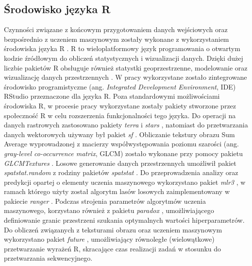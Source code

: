 \documentclass{amuthesis}
\begin{document}
\hypertarget{ux15brodowisko-jux119zyka-r}{%
\subsection{Środowisko języka R}\label{ux15brodowisko-jux119zyka-r}}

Czynności związane z końcowym przygotowaniem danych wejściowych oraz
bezpośrednio z uczeniem maszynowym zostały wykonane z wykorzystaniem
środowiska języka R \autocite{R-base}. R to wieloplatformowy język
programowania o otwartym kodzie źródłowym do obliczeń statystycznych i
wizualizacji danych. Dzięki dużej liczbie pakietów R obsługuje również
statystki geoprzestrzenne, modelowanie oraz wizualizację danych
przestrzennych \autocite{lovelace_2019_geocomputation}. W pracy
wykorzystane zostało zintegrowane środowisko programistyczne (ang.
\emph{Integrated Development Environment}, IDE) RStudio
\autocite{rstudio_team_2020_rstudio} przeznaczone dla języka R. Poza
standardowymi możliwościami środowiska R, w procesie pracy wykorzystane
zostały pakiety stworzone przez społeczność R w celu rozszerzenia
funkcjonalności tego języka. Do operacji na danych rastrowych
zastosowano pakiety \emph{terra} \autocite{R-terra} i \emph{stars}
\autocite{R-stars}, natomiast do przetwarzania danych wektorowych
używany był pakiet \emph{sf} \autocite{R-sf}. Obliczanie tekstury obrazu
Sum Average wyprowadzonej z macierzy współwystępowania poziomu szarości
(ang. \emph{gray-level co-occurrence matrix}, GLCM) zostało wykonane
przy pomocy pakietu \emph{GLCMTextures} \autocite{R-GLCMTextures}.
Losowe generowanie danych przestrzennych umożliwił pakiet
\emph{spatstat.random} \autocite{R-spatstat.random} z rodziny pakietów
\emph{spatstat} \autocite{R-spatstat}. Do przeprowadzenia analizy oraz
predykcji opartej o elementy uczenia maszynowego wykorzystano pakiet
\emph{mlr3} \autocite{R-mlr3}, w ramach którego użyty został algorytm
lasów losowych zaimplementowany w pakiecie \emph{ranger}
\autocite{R-ranger}. Podczas strojenia parametrów algorytmów uczenia
maszynowego, korzystano również z pakietu \emph{paradox}
\autocite{R-paradox}, umożliwiającego definiowanie granic przestrzeni
szukania optymalnych wartości hiperparametrów. Do obliczeń związanych z
teksturami obrazu oraz uczeniem maszynowym wykorzystano pakiet
\emph{future} \autocite{R-future}, umożliwiający równoległe
(wielowątkowe) przetwarzanie wyrażeń R, skracające czas realizacji zadań
w stosunku do przetwarzania sekwencyjnego.

\end{document}
